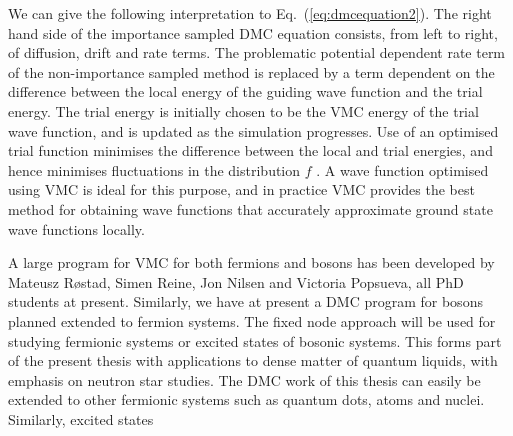 We can give the following interpretation to Eq.~(\ref{eq:dmcequation2}).
The right hand side of the importance sampled DMC equation
consists, from left to right, of diffusion, drift and rate terms. The
problematic potential dependent rate term of the non-importance 
sampled method is replaced by a term dependent on the difference 
between the local
energy of the guiding wave function and the trial energy. 
The trial energy is initially chosen to be the VMC energy of 
the trial  wave function, and is
updated as the simulation progresses. Use of an optimised 
trial function minimises the difference between the local 
and trial energies, and hence
minimises fluctuations in the distribution $f$ . 
A wave function optimised using VMC is ideal for this purpose, 
and in practice VMC provides the best
method for obtaining wave functions that accurately 
approximate ground state wave functions locally. 


A large program for VMC for both fermions and bosons has been developed by Mateusz R\o stad,
Simen Reine, Jon Nilsen and Victoria Popsueva, all PhD students at present.
Similarly, we have at present a DMC program for bosons planned extended to fermion systems.
The fixed node approach will be used for studying fermionic systems or excited states
of bosonic systems.
This forms part of the present thesis with applications to dense matter of 
quantum liquids, with emphasis on
neutron star studies. The DMC work of this thesis can easily be extended to other fermionic 
systems such as quantum dots, atoms and nuclei. Similarly,  excited states 


